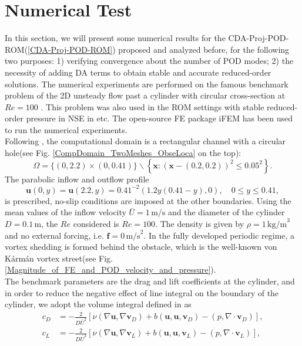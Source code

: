 \documentclass[10pt,twoside,openany,UTF8,CJK]{article}
\begin{document}
    \section{Numerical Test}\label{section-4}
	In this section, we will present some numerical results for the CDA-Proj-POD-ROM(\ref{CDA-Proj-POD-ROM}) proposed and analyzed before, for the following two purposes: 1) verifying convergence about the number of POD modes; 2) the necessity of adding DA terms to obtain stable and accurate reduced-order solutions. The numerical experiments are performed on the famous benchmark problem of the 2D unsteady flow past a cylinder with circular cross-section at $Re=100$ \cite{Benchmark-1996}. This problem was also used in the ROM settings with stable reduced-order pressure in NSE in \cite{POD-LPS-SINUM-2021,POD-LPS-SINUM-2020,Post-proc-POD-ROM-PresRecove-2022-CMAME} etc. The open-source FE package iFEM \cite{iFEM} has been used to run the numerical experiments.  \\
	\indent Following \cite{Benchmark-1996}, the computational domain is a rectangular channel with a circular hole(see Fig. \ref{CompDomain_TwoMeshes_ObseLoca} on the top):
	$$
	\Omega=\{(0,2.2) \times(0,0.41)\} \backslash\left\{\boldsymbol{x}:(\boldsymbol{x}-(0.2,0.2))^2 \leq 0.05^2\right\}.
	$$
	\indent The parabolic inflow and outflow profile 
	$$
	\boldsymbol{u}(0, y)=\boldsymbol{u}(2.2, y)=0.41^{-2}(1.2 y(0.41-y), 0), \quad 0 \leq y \leq 0.41,
	$$
	is prescribed, no-slip conditions are imposed at the other boundaries. Using the mean values of the inflow velocity $\bar{U}=1\,\text{m/s}$ and the diameter of the cylinder $D=0.1\,\text{m}$, the $Re$ considered is $Re=100$. The density is given by $\rho = 1\,\text{kg/m}^3$ and no external forcing, i.e. $\boldsymbol{f}=0\,\text{m/s}^2$. In the fully developed periodic regime, a vortex shedding is formed behind the obstacle, which is the well-known von Kármán vortex street(see Fig. \ref{Magnitude_of_FE_and_POD_velocity_and_pressure}). \\
	\indent The benchmark parameters are the drag and lift coefficients at the cylinder, and in order to reduce the negative effect of line integral on the boundary of the cylinder, we adopt the volume integral defined in \cite{benchmark-John-2001-IJNMF} as
	$$
	\begin{aligned}
		c_D & =-\frac{2}{D \bar{U}^2}\left[\nu\left(\nabla \boldsymbol{u}, \nabla \boldsymbol{v}_D\right)+b\left(\boldsymbol{u}, \boldsymbol{u}, \boldsymbol{v}_D\right)-\left(p, \nabla \cdot \boldsymbol{v}_D\right)\right], \\
		c_L & =-\frac{2}{D \bar{U}^2}\left[\nu\left(\nabla \boldsymbol{u}, \nabla \boldsymbol{v}_L\right)+b\left(\boldsymbol{u}, \boldsymbol{u}, \boldsymbol{v}_L\right)-\left(p, \nabla \cdot \boldsymbol{v}_L\right)\right],
	\end{aligned}
	$$		
\end{document}
